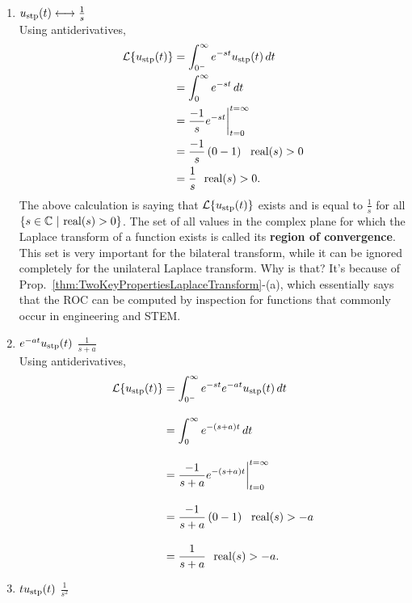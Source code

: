  \begin{enumerate}
\renewcommand{\labelenumi}{(\alph{enumi})}
\setlength{\itemsep}{.2cm}
    \item  \Ans \quad  $u_{\rm stp}(t) \longleftrightarrow \frac{1}{s}$\\

Using antiderivatives, 
\begin{align*}
    {\cal L}\{u_{\rm stp}(t) \} &= \int_{0^-}^\infty e^{-st} u_{\rm stp}(t) \, dt \\
    & =  \int_{0}^\infty e^{-st} \, dt \\
    & = \frac{-1}{s} e^{-st}\bigg|_{t = 0}^{t = \infty} \\
    & = \frac{-1}{s} \left( 0 - 1  \right) ~~{\rm real}(s)>0 \\
    & = \frac{1}{s} ~~{\rm real}(s)>0.
\end{align*}
The above calculation is saying that ${\cal L}\{u_{\rm stp}(t) \}$ exists and is equal to $\frac{1}{s}$ for all $\{ s \in \mathbb C~|~{\rm real}(s)>0\} $. The set of all values in the complex plane for which the Laplace transform of a function exists is called its \textbf{region of convergence}. This set is very important for the bilateral transform, while it can be ignored completely for the unilateral Laplace transform. Why is that? It's because of Prop.~\ref{thm:TwoKeyPropertiesLaplaceTransform}-(a), which essentially says that the ROC can be computed by inspection for functions that commonly occur in engineering and STEM.

    \item $e^{-at} u_{\rm stp}(t)$ \quad \Ans \quad $\frac{1}{s+a}$\\

Using antiderivatives, 
\begin{align*}
    {\cal L}\{u_{\rm stp}(t) \} &= \int_{0^-}^\infty e^{-st} e^{-at} u_{\rm stp}(t) \, dt \\[1em]
    & =  \int_{0}^\infty e^{-(s+a)t} \, dt \\[1em]
    & = \frac{-1}{s+a} e^{-(s+a)t}\bigg|_{t = 0}^{t = \infty} \\[1em]
    & = \frac{-1}{s+a} \left( 0 - 1  \right) ~~{\rm real}(s)> -a \\[1em]
    & = \frac{1}{s+a} ~~{\rm real}(s)> -a.
\end{align*}

    \item $t u_{\rm stp}(t)$ \quad \Ans \quad $\frac{1}{s^2}$\\


\end{enumerate}
